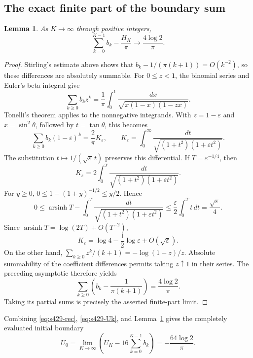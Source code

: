 \documentclass[11pt,a4paper]{article}
\newtheorem{lemma}[theorem]{Lemma}
\theoremstyle{remark}\newtheorem{remark}[theorem]{Remark}
\numberwithin{equation}{section}
\begin{document}
\subsection{The exact finite part of the boundary sum}
\begin{lemma}\label{lem:s429-finitepart}
As $K\to\infty$ through positive integers,
\[
 \sum_{k=0}^{K-1}b_k-\frac{H_K}{\pi}
 \longrightarrow\frac{4\log2}{\pi}.
\]
\end{lemma}
\begin{proof}
Stirling's estimate above shows that
$b_k-1/(\pi(k+1))=O(k^{-2})$, so these differences are absolutely
summable. For $0\le z<1$, the binomial series and Euler's beta integral
give
\[
 \sum_{k\ge0}b_kz^k
 =\frac1\pi\int_0^1\frac{dx}{\sqrt{x(1-x)(1-zx)}}.
\]
Tonelli's theorem applies to the nonnegative integrands.
With $z=1-\varepsilon$ and $x=\sin^2\theta$, followed by
$t=\tan\theta$, this becomes
\[
 \sum_{k\ge0}b_k(1-\varepsilon)^k
 =\frac2\pi K_\varepsilon,\qquad
 K_\varepsilon=\int_0^\infty
 \frac{dt}{\sqrt{(1+t^2)(1+\varepsilon t^2)}}.
\]
The substitution $t\mapsto1/(\sqrt\varepsilon\,t)$ preserves this
differential. If $T=\varepsilon^{-1/4}$, then
\[
 K_\varepsilon=2\int_0^T
 \frac{dt}{\sqrt{(1+t^2)(1+\varepsilon t^2)}}.
\]
For $y\ge0$, $0\le1-(1+y)^{-1/2}\le y/2$. Hence
\[
 0\le \operatorname{arsinh}T
 -\int_0^T\frac{dt}{\sqrt{(1+t^2)(1+\varepsilon t^2)}}
 \le\frac\varepsilon2\int_0^T t\,dt
 =\frac{\sqrt\varepsilon}{4}.
\]
Since $\operatorname{arsinh}T=\log(2T)+O(T^{-2})$,
\[
 K_\varepsilon=\log4-\frac12\log\varepsilon
 +O(\sqrt\varepsilon).
\]
On the other hand,
$\sum_{k\ge0}z^k/(k+1)=-\log(1-z)/z$.
Absolute summability of the coefficient differences permits taking
$z\uparrow1$ in their series. The preceding asymptotic therefore yields
\[
 \sum_{k\ge0}\left(b_k-\frac1{\pi(k+1)}\right)
 =\frac{4\log2}{\pi}.
\]
Taking its partial sums is precisely the asserted finite-part limit.
\end{proof}

Combining \eqref{eq:s429-rec}, \eqref{eq:s429-Uk}, and
Lemma~\ref{lem:s429-finitepart} gives the completely evaluated initial
boundary
\begin{equation}\label{eq:s429-U0}
 U_0=\lim_{K\to\infty}
 \left(U_K-16\sum_{k=0}^{K-1}b_k\right)
 =-\frac{64\log2}{\pi}.
\end{equation}
\end{document}
